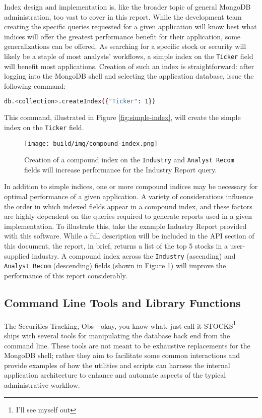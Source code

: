 \documentclass[
11pt,
titlepage,
]{article}
\begin{document}
Index design and implementation is, like the broader topic of general MongoDB
administration, too vast to cover in this report. While the development team
creating the specific queries requested for a given application will know best
what indices will offer the greatest performance benefit for their application,
some generalizations can be offered. As searching for a specific stock or
security will likely be a staple of most analysts' workflows, a simple index on
the \texttt{Ticker} field will benefit most applications. Creation of such an
index is straightforward: after logging into the MongoDB shell and selecting the
application database, issue the following command:

\begin{lstlisting}[language=sh]
  db.<collection>.createIndex({"Ticker": 1})
\end{lstlisting}

This command, illustrated in Figure \ref{fig:simple-index}, will create the
simple index on the \texttt{Ticker} field.

\begin{figure}[tbp]
  \texttt{[image: build/img/compound-index.png]}
  \caption{Creation of a compound index on the \texttt{Industry} and
    \texttt{Analyst Recom} fields will increase performance for the Industry
    Report query.}
  \label{fig:compound-index}
\end{figure}

In addition to simple indices, one or more compound indices may be necessary for
optimal performance of a given application. A variety of considerations
influence the order in which indexed fields appear in a compound index, and
these factors are highly dependent on the queries required to generate reports
used in a given implementation. To illustrate this, take the example Industry
Report provided with this software. While a full description will be included in
the API section of this document, the report, in brief, returns a list of the
top 5 stocks in a user-supplied industry. A compound index across the
\texttt{Industry} (ascending) and \texttt{Analyst Recom} (descending) fields
(shown in Figure \ref{fig:compound-index}) will improve the performance of this report
considerably.

\subsection{Command Line Tools and Library Functions}

The Securities Tracking, Obs---okay, you know what, just call it
STOCKS\footnote{I'll see myself out}---ships with several tools for manipulating
the database back end from the command line. These tools are not meant to be
exhaustive replacements for the MongoDB shell; rather they aim to facilitate
some common interactions and provide examples of how the utilities and scripts
can harness the internal application architecture to enhance and automate
aspects of the typical administrative workflow.
\end{document}
